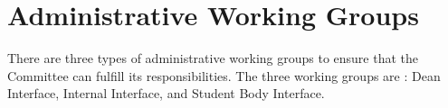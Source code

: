 \documentclass{article}
\begin{document}





\section{Administrative Working Groups}
There are three types of administrative working groups to ensure that the Committee can fulfill its responsibilities. The three working groups are : Dean Interface, Internal Interface, and Student Body Interface.
\end{document}
